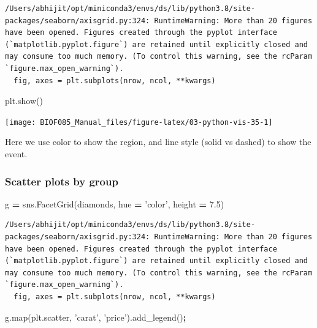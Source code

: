 \documentclass[
  letterpaper,
]{scrbook}
\newenvironment{Shaded}{\begin{snugshade}}{\end{snugshade}}
\newcommand{\BuiltInTok}[1]{#1}
\newcommand{\FloatTok}[1]{\textcolor[rgb]{0.00,0.00,0.81}{#1}}
\newcommand{\NormalTok}[1]{#1}
\newcommand{\OperatorTok}[1]{\textcolor[rgb]{0.81,0.36,0.00}{\textbf{#1}}}
\newcommand{\StringTok}[1]{\textcolor[rgb]{0.31,0.60,0.02}{#1}}
\begin{document}
\begin{verbatim}
/Users/abhijit/opt/miniconda3/envs/ds/lib/python3.8/site-packages/seaborn/axisgrid.py:324: RuntimeWarning: More than 20 figures have been opened. Figures created through the pyplot interface (`matplotlib.pyplot.figure`) are retained until explicitly closed and may consume too much memory. (To control this warning, see the rcParam `figure.max_open_warning`).
  fig, axes = plt.subplots(nrow, ncol, **kwargs)
\end{verbatim}

\begin{Shaded}
\begin{Highlighting}[]
\NormalTok{plt.show()}
\end{Highlighting}
\end{Shaded}

\begin{center}\texttt{[image: BIOF085\_Manual\_files/figure-latex/03-python-vis-35-1]} \end{center}

Here we use color to show the region, and line style (solid vs dashed) to show the event.

\hypertarget{scatter-plots-by-group}{%
\subsubsection{Scatter plots by group}\label{scatter-plots-by-group}}

\begin{Shaded}
\begin{Highlighting}[]
\NormalTok{g }\OperatorTok{=}\NormalTok{ sns.FacetGrid(diamonds, hue }\OperatorTok{=} \StringTok{'color'}\NormalTok{, height }\OperatorTok{=} \FloatTok{7.5}\NormalTok{)}
\end{Highlighting}
\end{Shaded}

\begin{verbatim}
/Users/abhijit/opt/miniconda3/envs/ds/lib/python3.8/site-packages/seaborn/axisgrid.py:324: RuntimeWarning: More than 20 figures have been opened. Figures created through the pyplot interface (`matplotlib.pyplot.figure`) are retained until explicitly closed and may consume too much memory. (To control this warning, see the rcParam `figure.max_open_warning`).
  fig, axes = plt.subplots(nrow, ncol, **kwargs)
\end{verbatim}

\begin{Shaded}
\begin{Highlighting}[]
\NormalTok{g.}\BuiltInTok{map}\NormalTok{(plt.scatter, }\StringTok{'carat'}\NormalTok{, }\StringTok{'price'}\NormalTok{).add_legend()}\OperatorTok{;}
\end{Highlighting}
\end{Shaded}
\end{document}

